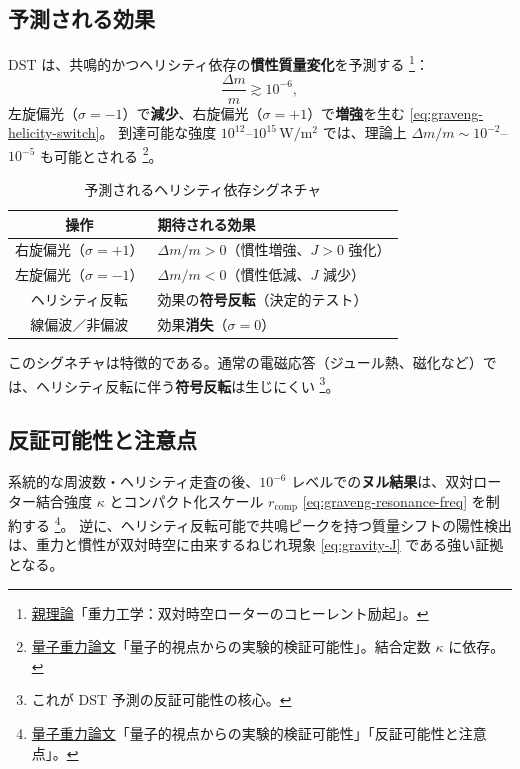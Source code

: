 \documentclass[dvipdfmx,a4paper,oneside]{jsbook}
\numberwithin{equation}{chapter}
\begin{document}
\subsection{予測される効果}

DST は、共鳴的かつヘリシティ依存の\textbf{慣性質量変化}を予測する \footnote{\hyperref[sec:sister-manuscripts]{親理論}「重力工学：双対時空ローターのコヒーレント励起」。}：
\begin{equation}
  \frac{\Delta m}{m} \gtrsim 10^{-6},
  \label{eq:graveng-delta-m}
\end{equation}
左旋偏光（\(\sigma = -1\)）で\textbf{減少}、右旋偏光（\(\sigma = +1\)）で\textbf{増強}を生む \eqref{eq:graveng-helicity-switch}。
到達可能な強度 \(10^{12}\)–\(10^{15}\,\mathrm{W/m^2}\) では、理論上 \(\Delta m/m \sim 10^{-2}\)–\(10^{-5}\) も可能とされる \footnote{\hyperref[sec:sister-manuscripts]{量子重力論文}「量子的視点からの実験的検証可能性」。結合定数 \(\kappa\) に依存。}。

\begin{table}[htbp]
  \centering
  \caption{予測されるヘリシティ依存シグネチャ}
  \label{tab:graveng-signatures}
  \begin{tabular}{@{}cl@{}}
    \toprule
    操作 & 期待される効果 \\
    \midrule
    右旋偏光（\(\sigma = +1\)） & \(\Delta m/m > 0\)（慣性増強、\(J > 0\) 強化） \\
    左旋偏光（\(\sigma = -1\)） & \(\Delta m/m < 0\)（慣性低減、\(J\) 減少） \\
    ヘリシティ反転 & 効果の\textbf{符号反転}（決定的テスト） \\
    線偏波／非偏波 & 効果\textbf{消失}（\(\sigma = 0\)） \\
    \bottomrule
  \end{tabular}
\end{table}

このシグネチャは特徴的である。通常の電磁応答（ジュール熱、磁化など）では、ヘリシティ反転に伴う\textbf{符号反転}は生じにくい \footnote{これが DST 予測の反証可能性の核心。}。

\subsection{反証可能性と注意点}

系統的な周波数・ヘリシティ走査の後、\(10^{-6}\) レベルでの\textbf{ヌル結果}は、双対ローター結合強度 \(\kappa\) とコンパクト化スケール \(r_{\mathrm{comp}}\) \eqref{eq:graveng-resonance-freq} を制約する \footnote{\hyperref[sec:sister-manuscripts]{量子重力論文}「量子的視点からの実験的検証可能性」「反証可能性と注意点」。}。
逆に、ヘリシティ反転可能で共鳴ピークを持つ質量シフトの陽性検出は、重力と慣性が双対時空に由来するねじれ現象 \eqref{eq:gravity-J} である強い証拠となる。
\end{document}
